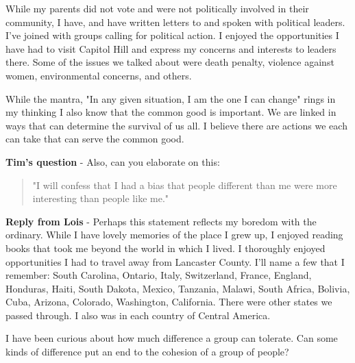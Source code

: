 While my parents did not vote and were not politically involved in their community, I have, and have written letters to and spoken with political leaders.
I've joined with groups calling for political action.
I enjoyed the opportunities I have had to visit Capitol Hill and express my concerns and interests to leaders there.
Some of the issues we talked about were death penalty, violence against women, environmental concerns, and others.

While the mantra, "In any given situation, I am the one I can change" rings in my thinking I also know that the common good is important.
We are linked in ways that can determine the survival of us all.
I believe there are actions we each can take that can serve the common good.

\textbf{Tim's question} - 
Also, can you elaborate on this: 
\begin{quotation}
"I will confess that I had a bias that people different than me were more interesting than people like me."
\end{quotation}

\textbf{Reply from Lois} - Perhaps this statement reflects my boredom with the ordinary.
While I have lovely memories of the place I grew up, I enjoyed reading books that took me beyond the world in which I lived.
I thoroughly enjoyed opportunities I had to travel away from Lancaster County.
I'll name a few that I remember: South Carolina, Ontario, Italy, Switzerland, France, England, Honduras, Haiti, South Dakota, Mexico, Tanzania, Malawi, South Africa, Bolivia, Cuba, Arizona, Colorado, Washington, California.
There were other states we passed through.
I also was in each country of Central America.

I have been curious about how much difference a group can tolerate.
Can some kinds of difference put an end to the cohesion of a group of people?







